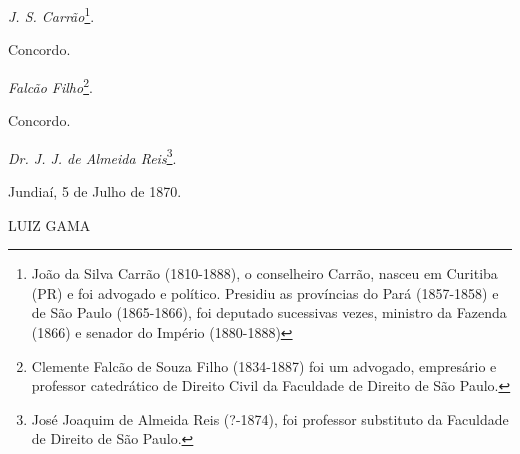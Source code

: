 \emph{J. S. Carrão}\footnote{João da Silva Carrão (1810-1888), o
  conselheiro Carrão, nasceu em Curitiba (PR) e foi advogado e político.
  Presidiu as províncias do Pará (1857-1858) e de São Paulo (1865-1866),
  foi deputado sucessivas vezes, ministro da Fazenda (1866) e senador do
  Império (1880-1888)}.

Concordo.

\emph{Falcão Filho}\footnote{Clemente Falcão de Souza Filho
  (1834-1887) foi um advogado, empresário e professor catedrático de
  Direito Civil da Faculdade de Direito de São Paulo.}.

Concordo.

\emph{Dr. J. J. de Almeida Reis}\footnote{José Joaquim de Almeida Reis
  (?-1874), foi professor substituto da Faculdade de Direito de São
  Paulo.}.

Jundiaí, 5 de Julho de
1870.

LUIZ GAMA

\pagebreak
\mbox{}\vfill
\thispagestyle{empty}

